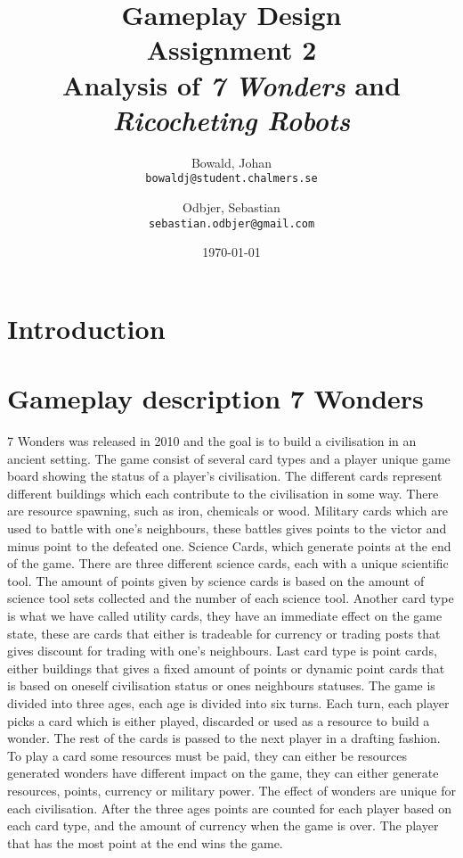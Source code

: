 \documentclass[a4paper]{article}
\title{Gameplay Design \\ Assignment 2 \\ Analysis of \textit{7 Wonders} and \textit{Ricocheting Robots} }
\author{
  Bowald, Johan\\
  \texttt{bowaldj@student.chalmers.se}
  \and
  Odbjer, Sebastian\\
  \texttt{sebastian.odbjer@gmail.com}
}
\date{\today}
\begin{document}
\maketitle
\newpage
\tableofcontents{}
\newpage
\section{Introduction}

\section{Gameplay description 7 Wonders}
\label{sec:what7wond}
7 Wonders was released in 2010 and the goal is to build a civilisation in an ancient setting. 
The game consist of several card types and a player unique game board showing the status of a player's civilisation.
The different cards represent different buildings which each contribute to the civilisation in some way.
There are resource spawning, such as iron, chemicals or wood. Military cards which are used to battle with one's neighbours, these battles gives points to the victor and minus point to the defeated one.
Science Cards, which generate points at the end of the game. There are three different science cards, each with a unique scientific tool.
The amount of points given by science cards is based on the amount of science tool sets collected and the number of each science tool.
Another card type is what we have called utility cards, they have an immediate effect on the game state, these are cards that either is tradeable for currency or trading posts that gives discount for trading with one's neighbours.
Last card type is point cards, either buildings that gives a fixed amount of points or dynamic point cards that is based on oneself civilisation status or ones neighbours statuses.
The game is divided into three ages, each age is divided into six turns.
Each turn, each player picks a card which is either played, discarded or used as a resource to build a wonder.
The rest of the cards is passed to the next player in a drafting fashion.
To play a card some resources must be paid, they can either be resources generated wonders have different impact on the game, they can either generate resources, points, currency or military power.
The effect of wonders are unique for each civilisation.
After the three ages points are counted for each player based on each card type, and the amount of currency when the game is over.
The player that has the most point at the end wins the game. 
\end{document}
